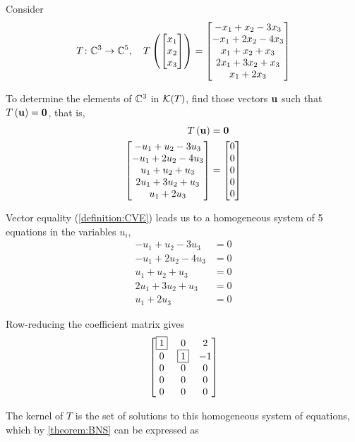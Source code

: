 \documentclass{ximera}
\begin{document}
\begin{example}

Consider
\[
T\colon \mathbb{C}^{3}\rightarrow\mathbb{C}^{5},\quad
T\left(\begin{bmatrix}x_1\\x_2\\x_3\end{bmatrix}\right)=
\begin{bmatrix}-x_1 + x_2 - 3 x_3\\
-x_1 + 2 x_2 - 4 x_3\\
x_1 + x_2 + x_3\\
2 x_1 + 3 x_2 + x_3\\
x_1 + 2 x_3
\end{bmatrix}
\]

To determine the elements of $\mathbb{C}^{3}$ in $\mathcal{K}\!\left(T\right)$, find those vectors $\mathbf{u}$ such that $T\left(\mathbf{u}\right)=\mathbf{0}$, that is,
\begin{align*}
T\left(\mathbf{u}\right)&=\mathbf{0}\\
\begin{bmatrix}-u_1 + u_2 - 3 u_3\\
-u_1 + 2 u_2 - 4 u_3\\
u_1 + u_2 + u_3\\
2 u_1 + 3 u_2 + u_3\\
u_1 + 2 u_3
\end{bmatrix}
&=
\begin{bmatrix}0\\0\\0\\0\\0\end{bmatrix}
\end{align*}




Vector equality (\ref{definition:CVE}) leads us to a homogeneous system of 5 equations in the variables $u_i$,
\begin{align*}
-u_1 + u_2 - 3 u_3&=0\\
-u_1 + 2 u_2 - 4 u_3&=0\\
u_1 + u_2 + u_3&=0\\
2 u_1 + 3 u_2 + u_3&=0\\
u_1 + 2 u_3&=0
\end{align*}




Row-reducing the coefficient matrix gives
\[
\begin{bmatrix}
\fbox{1} & 0 & 2\\
0 & \fbox{1} & -1\\
0 & 0 & 0\\
0 & 0 & 0\\
0 & 0 & 0
\end{bmatrix}
\]




The kernel of $T$ is the set of solutions to this homogeneous system of equations, which by \ref{theorem:BNS} can be expressed as
\begin{multipleChoice}
\end{multipleChoice}

\end{example}
\end{document}
